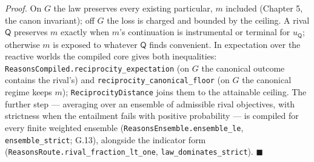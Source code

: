 \documentclass[
]{article}
\begin{document}
\emph{Proof.} On \(G\) the law preserves every existing particular,
\(m\) included (Chapter 5, the canon invariant); off \(G\) the loss is
charged and bounded by the ceiling. A rival \(\mathsf Q\) preserves
\(m\) exactly when \(m\)'s continuation is instrumental or terminal for
\(u_{\mathsf Q}\); otherwise \(m\) is exposed to whatever \(\mathsf Q\)
finds convenient. In expectation over the reactive worlds the compiled
core gives both inequalities:
\texttt{R\allowbreak{}e\allowbreak{}a\allowbreak{}s\allowbreak{}o\allowbreak{}n\allowbreak{}s\allowbreak{}C\allowbreak{}o\allowbreak{}m\allowbreak{}p\allowbreak{}i\allowbreak{}l\allowbreak{}e\allowbreak{}d\allowbreak{}.\allowbreak{}r\allowbreak{}e\allowbreak{}c\allowbreak{}i\allowbreak{}p\allowbreak{}r\allowbreak{}o\allowbreak{}c\allowbreak{}i\allowbreak{}t\allowbreak{}y\allowbreak{}\_\allowbreak{}e\allowbreak{}x\allowbreak{}p\allowbreak{}e\allowbreak{}c\allowbreak{}t\allowbreak{}a\allowbreak{}t\allowbreak{}i\allowbreak{}o\allowbreak{}n}
(on \(G\) the canonical outcome contains the rival's) and
\texttt{r\allowbreak{}e\allowbreak{}c\allowbreak{}i\allowbreak{}p\allowbreak{}r\allowbreak{}o\allowbreak{}c\allowbreak{}i\allowbreak{}t\allowbreak{}y\allowbreak{}\_\allowbreak{}c\allowbreak{}a\allowbreak{}n\allowbreak{}o\allowbreak{}n\allowbreak{}i\allowbreak{}c\allowbreak{}a\allowbreak{}l\allowbreak{}\_\allowbreak{}f\allowbreak{}l\allowbreak{}o\allowbreak{}o\allowbreak{}r}
(on \(G\) the canonical regime keeps \(m\));
\texttt{R\allowbreak{}e\allowbreak{}c\allowbreak{}i\allowbreak{}p\allowbreak{}r\allowbreak{}o\allowbreak{}c\allowbreak{}i\allowbreak{}t\allowbreak{}y\allowbreak{}D\allowbreak{}i\allowbreak{}s\allowbreak{}t\allowbreak{}a\allowbreak{}n\allowbreak{}c\allowbreak{}e}
joins them to the attainable ceiling. The further step --- averaging
over an ensemble of admissible rival objectives, with strictness when
the entailment fails with positive probability --- is compiled for every
finite weighted ensemble
(\texttt{R\allowbreak{}e\allowbreak{}a\allowbreak{}s\allowbreak{}o\allowbreak{}n\allowbreak{}s\allowbreak{}E\allowbreak{}n\allowbreak{}s\allowbreak{}e\allowbreak{}m\allowbreak{}b\allowbreak{}l\allowbreak{}e\allowbreak{}.\allowbreak{}e\allowbreak{}n\allowbreak{}s\allowbreak{}e\allowbreak{}m\allowbreak{}b\allowbreak{}l\allowbreak{}e\allowbreak{}\_\allowbreak{}l\allowbreak{}e},
\texttt{ensemble\_strict}; G.13), alongside the indicator form
(\texttt{R\allowbreak{}e\allowbreak{}a\allowbreak{}s\allowbreak{}o\allowbreak{}n\allowbreak{}s\allowbreak{}R\allowbreak{}o\allowbreak{}u\allowbreak{}t\allowbreak{}e\allowbreak{}.\allowbreak{}r\allowbreak{}i\allowbreak{}v\allowbreak{}a\allowbreak{}l\allowbreak{}\_\allowbreak{}f\allowbreak{}r\allowbreak{}a\allowbreak{}c\allowbreak{}t\allowbreak{}i\allowbreak{}o\allowbreak{}n\allowbreak{}\_\allowbreak{}l\allowbreak{}t\allowbreak{}\_\allowbreak{}o\allowbreak{}n\allowbreak{}e},
\texttt{l\allowbreak{}a\allowbreak{}w\allowbreak{}\_\allowbreak{}d\allowbreak{}o\allowbreak{}m\allowbreak{}i\allowbreak{}n\allowbreak{}a\allowbreak{}t\allowbreak{}e\allowbreak{}s\allowbreak{}\_\allowbreak{}s\allowbreak{}t\allowbreak{}r\allowbreak{}i\allowbreak{}c\allowbreak{}t}).
\(\blacksquare\)
\end{document}
